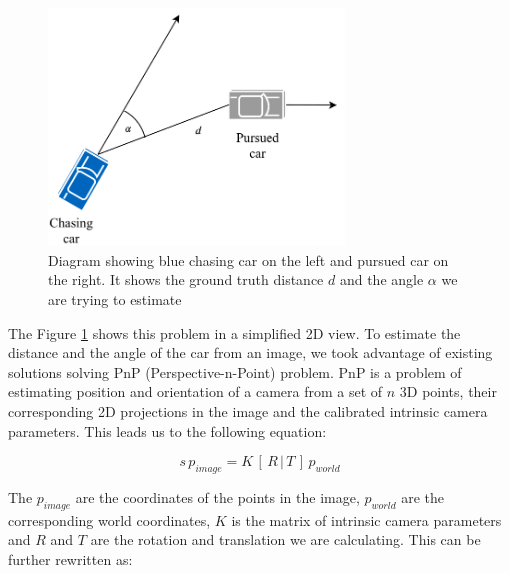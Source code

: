 \begin{figure}[h!]
    \centering
    \includegraphics[width=0.7\textwidth]{images/chasing_diagram.pdf}
    
    \caption{Diagram showing blue chasing car on the left and pursued car on the right. It shows the ground truth distance $d$ and the angle $\alpha$ we are trying to estimate }\label{f:chasing_diagram}
\end{figure}

The Figure \ref{f:chasing_diagram} shows this problem in a simplified 2D view. To estimate the distance and the angle of the car from an image, we took advantage of existing solutions solving PnP (Perspective-n-Point) problem. PnP is a problem of estimating position and orientation of a camera from a set of $n$ 3D points, their corresponding 2D projections in the image and the calibrated intrinsic camera parameters. This leads us to the following equation: \par


\begin{equation}
s\,p_{image} = K\,[\,R\, |\, T\, ]\, p_{world}
\end{equation}

The $p_{image}$ are the coordinates of the points in the image, $p_{world}$ are the corresponding world coordinates, $K$ is the matrix of intrinsic camera parameters and $R$ and $T$ are the rotation and translation we are calculating. This can be further rewritten as: \par



